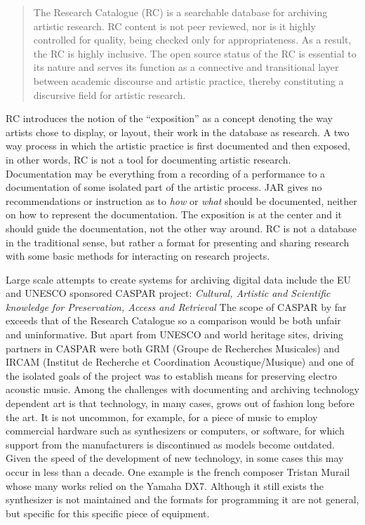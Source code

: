 \documentclass[11pt,a4paper]{article}
\begin{document}
\begin{quote}
  The Research Catalogue (RC) is a searchable database for archiving artistic research. RC content is not peer reviewed, nor is it highly controlled for quality, being checked only for appropriateness. As a result, the RC is highly inclusive. The open source status of the RC is essential to its nature and serves its function as a connective and transitional layer between academic discourse and artistic practice, thereby constituting a discursive field for artistic research. \cite{rc2017}
\end{quote}

RC introduces the notion of the ``exposition'' as a concept denoting the way artists chose to display, or layout, their work in the database as research. A two way process in which the artistic practice is first documented and then exposed, in other words, RC is not a tool for documenting artistic research. Documentation may be everything from a recording of a performance to a documentation of some isolated part of the artistic process. JAR gives no recommendations or instruction as to \emph{how} or \emph{what} should be documented, neither on how to represent the documentation. The exposition is at the center and it should guide the documentation, not the other way around. RC is not a database in the traditional sense, but rather a format for presenting and sharing research with some basic methods for interacting on research projects.

Large scale attempts to create systems for archiving digital data include the EU and UNESCO sponsored CASPAR project: \emph{Cultural, Artistic and Scientific knowledge for Preservation, Access and Retrieval} \citep{Douglas2007,Roeder2006,Bachimont:03,cuervo2011} The scope of CASPAR by far exceeds that of the Research Catalogue so a comparison would be both unfair and uninformative. But apart from UNESCO and world heritage sites, driving partners in CASPAR were both GRM (Groupe de Recherches Musicales) and IRCAM (Institut de Recherche et Coordination Acoustique/Musique) and one of the isolated goals of the project was to establish means for preserving electro acoustic music. Among the challenges with documenting and archiving technology dependent art is that technology, in many cases, grows out of fashion long before the art. It is not uncommon, for example, for a piece of music to employ commercial hardware such as synthesizers or computers, or software, for which support from the manufacturers is discontinued as models become outdated. Given the speed of the development of new technology, in some cases this may occur in less than a decade. One example is the french composer Tristan Murail whose many works relied on the Yamaha DX7. Although it still exists the synthesizer is not maintained and the formats for programming it are not general, but specific for this specific piece of equipment.
\end{document}
